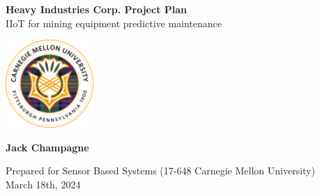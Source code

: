 \begin{titlepage}
    \begin{center}
    {\fontsize{40}{48}\selectfont \bfseries Heavy Industries Corp. Project Plan} 
    \\\vspace{20pt}
    {\LARGE IIoT for mining equipment predictive maintenance} \\
    \vspace{20pt}
    
    \vfill %

        \includegraphics[width=0.25\textwidth]{Images/cmu_thistle.png}

        \vfill %
        \textbf{Jack Champagne}

        Prepared for Sensor Based Systems (17-648 Carnegie Mellon University)\\
        March 18th, 2024
    \end{center}
\end{titlepage}